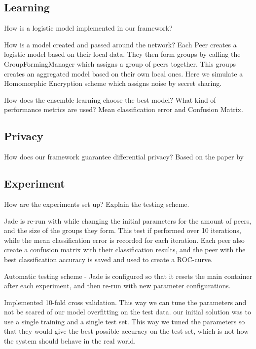 \subsection{Learning}
How is a logistic model implemented in our framework?

How is a model created and passed around the network?
Each Peer creates a logistic model based on their local data. They then form groups by calling the GroupFormingManager which assigns a group of peers together. This groups creates an aggregated model based on their own local ones. Here we simulate a Homomorphic Encryption scheme which assigns noise by secret sharing. 


How does the ensemble learning choose the best model?
What kind of performance metrics are used?
Mean classification error and Confusion Matrix.

\subsection{Privacy}
How does our framework guarantee differential privacy?
Based on the paper by 

\subsection{Experiment}
How are the experiments set up?
Explain the testing scheme.

Jade is re-run with while changing the initial parameters for the amount of peers, and the size of the groups they form. This test if performed over 10 iterations, while the mean classification error is recorded for each iteration. Each peer also create a confusion matrix with their classification results, and the peer with the best classification accuracy is saved and used to create a ROC-curve. 

Automatic testing scheme - Jade is configured so that it resets the main container after each experiment, and then re-run with new parameter configurations. 

Implemented 10-fold cross validation. This way we can tune the parameters and not be scared of our model overfitting on the test data. our initial solution was to use a single training and a single test set. This way we tuned the parameters so that they would give the best possible accuracy on the test set, which is not how the system should behave in the real world. 



\cleardoublepage